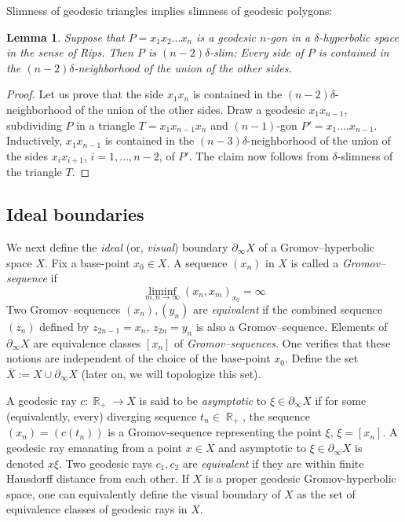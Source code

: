 \documentclass[12pt]{amsbook}%
\newtheorem{lem}[thm]{Lemma}
\theoremstyle{definition}
\theoremstyle{remark}
\numberwithin{section}{chapter}
\numberwithin{subsection}{section}
\numberwithin{figure}{chapter}
\DeclareMathOperator{\R}{\mathbb{R}}
\def\geo{\partial_\infty}
\def\ol{\overline}
\begin{document}
Slimness of geodesic triangles implies slimness of geodesic polygons:

\begin{lem}\label{lem:thinpolygons}
Suppose that $P=x_1x_2...x_n$ is a geodesic $n$-gon in a $\delta$-hyperbolic space in the sense of Rips. Then 
$P$ is $(n-2)\delta$-slim: Every side of $P$ is contained in the $(n-2)\delta$-neighborhood of the union of the other sides. 
\end{lem}
\begin{proof} Let us prove that the side $x_1x_n$ is contained in the $(n-2)\delta$-neighborhood of the union of the other sides. Draw a geodesic $x_1 x_{n-1}$, subdividing $P$ in a triangle $T=x_1x_{n-1}x_n$ and $(n-1)$-gon $P'= x_1....x_{n-1}$. Inductively, $x_1 x_{n-1}$ is contained in the $(n-3)\delta$-neighborhood of the union of the sides 
$x_ix_{i+1}$, $i=1,...,n-2$, of $P'$. The claim now follows from $\delta$-slimness of the triangle $T$. 
\end{proof}

\subsection{Ideal boundaries}\label{sec:ideal boundaries}


We next define the {\em ideal} (or, {\em visual}) boundary $\geo X$ \index{$\geo X$, visual boundary} 
of a Gromov--hyperbolic space $X$. Fix a base-point $x_0\in X$. 
A sequence $(x_n)$ in $X$ is called a {\em Gromov--sequence} if  
$$
\liminf_{m, n\to\infty} (x_n, x_m)_{x_0}= \infty
$$
Two Gromov--sequences $(x_n), (y_n)$ are {\em equivalent} if the combined sequence 
$(z_n)$ defined by $z_{2n-1}=x_n$, $z_{2n}=y_n$ is also a Gromov--sequence. 
 Elements of $\geo X$ are equivalence classes $[x_n]$ of {\em Gromov--sequences}. 
 One verifies that these notions are independent of the choice of the base-point $x_0$.   Define the set $\ol{X}:= X\cup \geo X$ (later on, we will topologize this set).  

 
 A geodesic ray $c: \R_+\to X$ is said to be {\em asymptotic} to $\xi\in \geo X$ if for some (equivalently, every) diverging sequence $t_n\in \R_+$, the sequence $(x_n)=(c(t_n))$ is a Gromov-sequence representing the point $\xi$, $\xi=[x_n]$. 
 A geodesic ray emanating from a point $x\in X$ and asymptotic to $\xi\in \geo X$ is denoted $x\xi$.   Two geodesic rays $c_1, c_2$ are {\em equivalent} if they are within finite Hausdorff distance from each other. If $X$ is a proper geodesic Gromov-hyperbolic space, one can equivalently define the visual boundary of $X$ as the set of equivalence classes of geodesic rays in $X$.      
 
\end{document}

